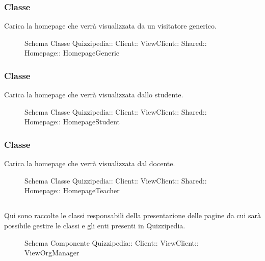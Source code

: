 \subsubsection{Classe }
Carica la homepage che verrà visualizzata da un visitatore generico.
\begin{figure}[H]
\centering
\noindent{}
\caption[Schema Classe HomepageGeneric]{Schema Classe Quizzipedia:: Client:: ViewClient:: Shared:: Homepage:: HomepageGeneric}
\end{figure}
\subsubsection{Classe }
Carica la homepage che verrà visualizzata dallo studente.
\begin{figure}[H]
\centering
\noindent{}
\caption[Schema Classe HomepageStudent]{Schema Classe Quizzipedia:: Client:: ViewClient:: Shared:: Homepage:: HomepageStudent}
\end{figure}
\subsubsection{Classe }
Carica la homepage che verrà visualizzata dal docente.
\begin{figure}[H]
\centering
\noindent{}
\caption[Schema Classe HomepageTeacher]{Schema Classe Quizzipedia:: Client:: ViewClient:: Shared:: Homepage:: HomepageTeacher}
\end{figure}
\subsection{}
Qui sono raccolte le classi responsabili della presentazione delle pagine da cui sarà possibile gestire le classi e gli enti presenti in Quizzipedia.
\begin{figure}[H]
\centering
\noindent{}
\caption[Schema Componente Quizzipedia::Client::ViewClient::ViewOrgManager]{Schema Componente Quizzipedia:: Client:: ViewClient:: ViewOrgManager}
\end{figure}
